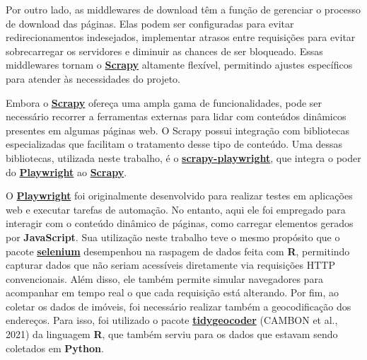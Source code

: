\documentclass[
  12pt,
  a4paper,
]{scrreprt}
\begin{document}
\vspace{12pt}

Por outro lado, as middlewares de download têm a função de gerenciar o
processo de download das páginas. Elas podem ser configuradas para
evitar redirecionamentos indesejados, implementar atrasos entre
requisições para evitar sobrecarregar os servidores e diminuir as
chances de ser bloqueado. Essas middlewares tornam o
\href{https://docs.scrapy.org/en/latest}{\textbf{Scrapy}} altamente
flexível, permitindo ajustes específicos para atender às necessidades do
projeto.

\vspace{12pt}

Embora o \href{https://docs.scrapy.org/en/latest}{\textbf{Scrapy}}
ofereça uma ampla gama de funcionalidades, pode ser necessário recorrer
a ferramentas externas para lidar com conteúdos dinâmicos presentes em
algumas páginas web. O Scrapy possui integração com bibliotecas
especializadas que facilitam o tratamento desse tipo de conteúdo. Uma
dessas bibliotecas, utilizada neste trabalho, é o
\href{https://github.com/scrapy-plugins/scrapy-playwright}{\textbf{scrapy-playwright}},
que integra o poder do
\href{https://playwright.dev/python/}{\textbf{Playwright}} ao
\href{https://docs.scrapy.org/en/latest}{\textbf{Scrapy}}.

\vspace{12pt}

O \href{https://playwright.dev/python/}{\textbf{Playwright}} foi
originalmente desenvolvido para realizar testes em aplicações web e
executar tarefas de automação. No entanto, aqui ele foi empregado para
interagir com o conteúdo dinâmico de páginas, como carregar elementos
gerados por \textbf{JavaScript}. Sua utilização neste trabalho teve o
mesmo propósito que o pacote
\href{https://cran.r-project.org/web/packages/selenium/index.html}{\textbf{selenium}}
desempenhou na raspagem de dados feita com \textbf{R}, permitindo
capturar dados que não seriam acessíveis diretamente via requisições
HTTP convencionais. Além disso, ele também permite simular navegadores
para acompanhar em tempo real o que cada requisição está alterando. Por
fim, ao coletar os dados de imóveis, foi necessário realizar também a
geocodificação dos endereços. Para isso, foi utilizado o pacote
\href{https://jessecambon.github.io/tidygeocoder/}{\textbf{tidygeocoder}}
(CAMBON et al., 2021) da linguagem \textbf{R}, que também serviu para os
dados que estavam sendo coletados em \textbf{Python}.

\vspace{12pt}
\end{document}
